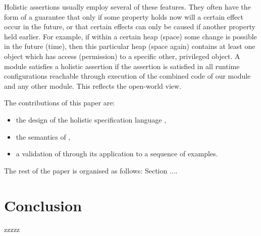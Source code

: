 \documentclass[acmsmall,screen]{acmart}
\newcommand{\ponders}[3]{\marginpar{\tiny\itshape\raggedright\textcolor{#2}{\textbf{#1:} #3}}\ignorespaces}
\newcommand{\susan}[1]{} %
\newcommand{\james}[1]{} %
\begin{document}
Holistic assertions usually employ several of these features. They often have the form  of a guarantee
that only if some property holds now will a certain effect occur in the future, or that
certain effects can only be caused if another property held earlier.
For example, if within a certain heap (space) some change is possible in the future (time), then this particular heap 
(space again) contains 
at least one object which has access (permission) to a specific other, privileged object.
A module satisfies a holistic assertion if  
 the assertion is satisfied  in all runtime configurations reachable through execution of the combined code of our module and any other module.
  This reflects the open-world view.


The contributions of this paper are:
\begin{itemize}
\item the design of the holistic specification language \Chainmail,
\item the semantics of \Chainmail,
\item a validation of \Chainmail through its application to a sequence of examples.
\end{itemize}  
  
  
The rest of the paper is organised as follows: Section ....
 
\section{Conclusion}
zzzzz
 

\end{document}
